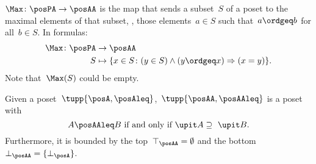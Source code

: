 \begin{definition}[Max]
  \label{def:Max}
  $\Max \colon \posPA \to \posAA$ is the map that sends a subset~$S$ of a poset to the maximal elements of that subset, \ie , those elements~$a \in S$ such that~$a \ordgeq b$ for all~$b \in S$. In formulas:
  \begin{equation*}
    \begin{aligned}
      \Max \colon \posPA &\to \posAA\\
      S&\mapsto \{ x\in S\colon (y\in S)\wedge(y\ordgeq x)\Rightarrow (x=y)\}.
    \end{aligned}
  \end{equation*}
  Note that~$\Max(S)$ could be empty.
\end{definition}


\begin{lemma}
  Given a poset~$\tupp{\posA,\posAleq}$,~$\tupp{\posAA,\posAAleq}$ is a poset with
  \begin{equation}
    \label{eq:orderantichain}
    A\posAAleq B \text{ if and only if } \upit  A \supseteq \ \upit  B.
  \end{equation}
  Furthermore, it is bounded by the top~$\top_{\posAA}=\emptyset$ and the bottom~$\bot_{\posAA}=\{\bot_{\posA}\}$.
\end{lemma}

